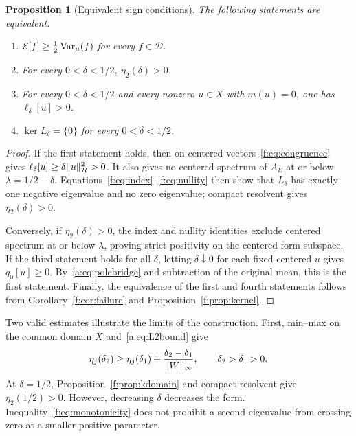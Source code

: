 \documentclass[11pt,a4paper]{article}
\numberwithin{equation}{section}
\newtheorem{proposition}[theorem]{Proposition}
\theoremstyle{definition}\newtheorem{definition}[theorem]{Definition}
\theoremstyle{remark}\newtheorem{remark}[theorem]{Remark}
\newcommand{\E}{\mathcal E}\newcommand{\D}{\mathcal D}
\newcommand{\Hh}{\mathcal H}\newcommand{\Hw}{\mathcal H}
\begin{document}
\begin{proposition}[Equivalent sign conditions]\label{f:prop:sign}
The following statements are equivalent:
\begin{enumerate}
\item $\E[f]\ge\tfrac12\Var_\mu(f)$ for every $f\in\D$.
\item For every $0<\delta<1/2$, $\eta_2(\delta)>0$.
\item For every $0<\delta<1/2$ and every nonzero $u\in X$ with $m(u)=0$, one has $\ell_\delta[u]>0$.
\item $\ker L_\delta=\{0\}$ for every $0<\delta<1/2$.
\end{enumerate}
\end{proposition}
\begin{proof}
If the first statement holds, then on centered vectors~\eqref{f:eq:congruence} gives $\ell_\delta[u]\ge\delta\norm{u}_{\Hh}^2>0$. It also gives no centered spectrum of $A_E$ at or below $\lambda=1/2-\delta$. Equations~\eqref{f:eq:index}--\eqref{f:eq:nullity} then show that $L_\delta$ has exactly one negative eigenvalue and no zero eigenvalue; compact resolvent gives $\eta_2(\delta)>0$.

Conversely, if $\eta_2(\delta)>0$, the index and nullity identities exclude centered spectrum at or below $\lambda$, proving strict positivity on the centered form subspace. If the third statement holds for all $\delta$, letting $\delta\downarrow0$ for each fixed centered $u$ gives $q_0[u]\ge0$. By~\eqref{a:eq:polebridge} and subtraction of the original mean, this is the first statement. Finally, the equivalence of the first and fourth statements follows from Corollary~\ref{f:cor:failure} and Proposition~\ref{f:prop:kernel}.
\end{proof}

Two valid estimates illustrate the limits of the construction. First, min--max on the common domain $X$ and~\eqref{a:eq:L2bound} give
\begin{equation}\label{f:eq:monotonicity}
 \eta_j(\delta_2)\ge\eta_j(\delta_1)
       +\frac{\delta_2-\delta_1}{\lVert W\rVert_\infty},
       \qquad\delta_2>\delta_1>0.
\end{equation}
At $\delta=1/2$, Proposition~\ref{f:prop:kdomain} and compact resolvent give $\eta_2(1/2)>0$. However, decreasing $\delta$ decreases the form. Inequality~\eqref{f:eq:monotonicity} does not prohibit a second eigenvalue from crossing zero at a smaller positive parameter.
\end{document}
